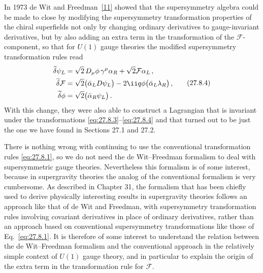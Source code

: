 In 1973 de Wit and Freedman~\hyperref[ch27-ref-11]{[11]} showed that the
supersymmetry algebra could be made to close by modifying the supersymmetry
transformation properties of the chiral superfields not only by changing
ordinary derivatives to gauge-invariant derivatives, but by also adding an
extra term in the transformation of the \(\mathcal{F}\)-component, so that
for \(U(1)\) gauge theories the modified supersymmetry transformation rules
read
\begin{equation}
  \begin{aligned}
    \widetilde{\delta}\psi_L
    &=\sqrt{2}\,D_\mu\phi\,\gamma^\mu\alpha_R
      +\sqrt{2}\mathcal{F}\alpha_L\,,\\
    \widetilde{\delta}\mathcal{F}
    &=\sqrt{2}\bigl(\bar\alpha_L\sl{D}\psi_L\bigr)
      -2\ii q\phi\bigl(\bar\alpha_L\lambda_R\bigr)\,,\\
    \widetilde{\delta}\phi
    &=\sqrt{2}\bigl(\bar\alpha_R\psi_L\bigr)\,.
  \end{aligned}
  \tag{27.8.4}\label{eq:27.8.4}
\end{equation}
With this change, they were also able to construct a Lagrangian that is
invariant under the transformations \eqref{eq:27.8.3}--\eqref{eq:27.8.4}
and that turned out to be just the one we have found in Sections 27.1 and
27.2.

There is nothing wrong with continuing to use the conventional
transformation rules \eqref{eq:27.8.1}, so we do not need the de
Wit--Freedman formalism to deal with supersymmetric gauge theories.
Nevertheless this formalism is of some interest, because in supergravity
theories the analog of the conventional formalism is very cumbersome. As
described in Chapter 31, the formalism that has been chiefly used to derive
physically interesting results in supergravity theories follows an approach
like that of de Wit and Freedman, with supersymmetry transformation rules
involving covariant derivatives in place of ordinary derivatives, rather
than an approach based on conventional supersymmetry transformations like
those of Eq.~\eqref{eq:27.8.1}. It is therefore of some interest to
understand the relation between the de Wit--Freedman formalism and the
conventional approach in the relatively simple context of \(U(1)\) gauge
theory, and in particular to explain the origin of the extra term in the
transformation rule for \(\mathcal{F}\).

